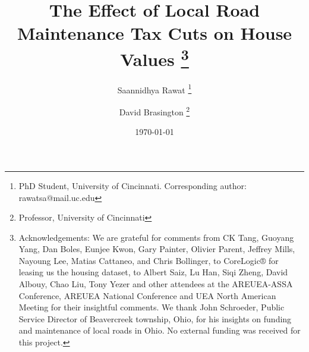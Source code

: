 \documentclass[12pt]{article}
\begin{document}
\begin{titlepage}
\title{The Effect of Local Road Maintenance Tax Cuts on House Values
\thanks{Acknowledgements: We are grateful for comments from CK Tang, Guoyang Yang, Dan Boles, Eunjee Kwon, Gary Painter, Olivier Parent, Jeffrey Mills, Nayoung Lee, Matias Cattaneo, and Chris Bollinger, to CoreLogic® for leasing us the housing dataset, to Albert Saiz, Lu Han, Siqi Zheng, David Albouy, Chao Liu, Tony Yezer and other attendees at the AREUEA-ASSA  Conference, AREUEA National Conference and UEA North American Meeting for their insightful comments. We thank John Schroeder, Public Service Director of Beavercreek township, Ohio, for his insights on funding and maintenance of local roads in Ohio. No external funding was received for this project.}}
\author{Saannidhya Rawat \thanks{PhD Student, University of Cincinnati. Corresponding author: rawatsa@mail.uc.edu} \and David Brasington \thanks{Professor, University of Cincinnati}}
\date{\today} 
\maketitle

\vspace{-2em}  


\end{titlepage}
\end{document}
